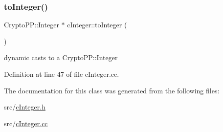 \mbox{\label{classcInteger_a902f278d935322e8cce372ad4c465393}} 
\subsubsection{\texorpdfstring{to\+Integer()}{toInteger()}}
{\footnotesize\ttfamily Crypto\+P\+P\+::\+Integer $\ast$ c\+Integer\+::to\+Integer (\begin{DoxyParamCaption}{ }\end{DoxyParamCaption})}

dynamic casts to a Crypto\+P\+P\+::\+Integer 

Definition at line 47 of file c\+Integer.\+cc.



The documentation for this class was generated from the following files\+:\begin{DoxyCompactItemize}
\item 
src/\hyperlink{cInteger_8h}{c\+Integer.\+h}\item 
src/\hyperlink{cInteger_8cc}{c\+Integer.\+cc}\end{DoxyCompactItemize}
